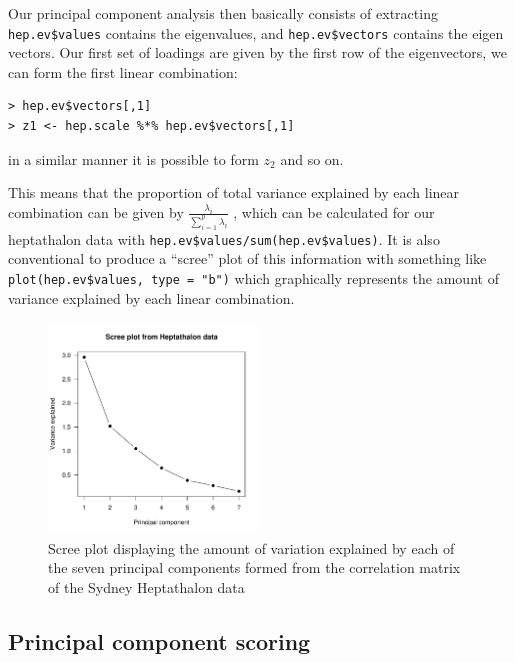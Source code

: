 Our principal component analysis then basically consists of extracting \verb+hep.ev$values+ contains the eigenvalues, and \verb+hep.ev$vectors+ contains the eigen vectors.   Our first set of loadings are given by the first row of the eigenvectors, we can form the first linear combination:

\singlespacing
\begin{verbatim}
> hep.ev$vectors[,1]
> z1 <- hep.scale %*% hep.ev$vectors[,1]
\end{verbatim}
\onehalfspacing

in a similar manner it is possible to form $z_{2}$ and so on.  


This means that the proportion of total variance explained by each linear combination can be given by $\frac{\lambda_{i}}{ \sum_{i=1}^{p} \lambda_{i}}$
, which can be calculated for our heptathalon data with \verb+hep.ev$values/sum(hep.ev$values)+.   It is also conventional to produce a ``scree'' plot of this information with something like \verb+plot(hep.ev$values, type = "b")+ which graphically represents the amount of variance explained by each linear combination.



\begin{figure}
\begin{center}
\includegraphics[width = 0.5\textwidth]{images/HeptathScree} 
\caption{Scree plot displaying the amount of variation explained by each of the seven principal components formed from the correlation matrix of the Sydney Heptathalon data}
\label{screeplot}
\end{center}
\end{figure}


\subsection{Principal component scoring}

